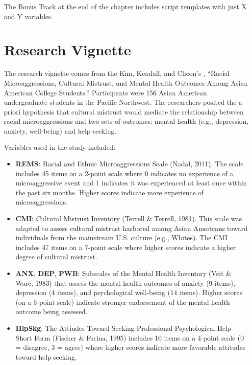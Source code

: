 \documentclass[
  english,
]{book}
\providecommand{\tightlist}{%
  \setlength{\itemsep}{0pt}\setlength{\parskip}{0pt}}
\begin{document}
The Bonus Track at the end of the chapter includes script templates with just X and Y variables.

\hypertarget{research-vignette-7}{%
\section{Research Vignette}\label{research-vignette-7}}

The research vignette comes from the Kim, Kendall, and Cheon's \citeyearpar{kim_racial_2017}, ``Racial Microaggressions, Cultural Mistrust, and Mental Health Outcomes Among Asian American College Students.'' Participants were 156 Asian American undergraduate students in the Pacific Northwest. The researchers posited the a priori hypothesis that cultural mistrust would mediate the relationship between racial microaggressions and two sets of outcomes: mental health (e.g., depression, anxiety, well-being) and help-seeking.

Variables used in the study included:

\begin{itemize}
\tightlist
\item
  \textbf{REMS}: Racial and Ethnic Microaggressions Scale (Nadal, 2011). The scale includes 45 items on a 2-point scale where 0 indicates no experience of a microaggressive event and 1 indicates it was experienced at least once within the past six months. Higher scores indicate more experience of microaggressions.
\item
  \textbf{CMI}: Cultural Mistrust Inventory (Terrell \& Terrell, 1981). This scale was adapted to assess cultural mistrust harbored among Asian Americans toward individuals from the mainstream U.S. culture (e.g., Whites). The CMI includes 47 items on a 7-point scale where higher scores indicate a higher degree of cultural mistrust.
\item
  \textbf{ANX}, \textbf{DEP}, \textbf{PWB}: Subscales of the Mental Health Inventory (Veit \& Ware, 1983) that assess the mental health outcomes of anxiety (9 items), depression (4 items), and psychological well-being (14 items). Higher scores (on a 6 point scale) indicate stronger endorsement of the mental health outcome being assessed.
\item
  \textbf{HlpSkg}: The Attiudes Toward Seeking Professional Psychological Help -- Short Form (Fischer \& Farina, 1995) includes 10 items on a 4-point scale (0 = disagree, 3 = agree) where higher scores indicate more favorable attitudes toward help seeking.
\end{itemize}
\end{document}
